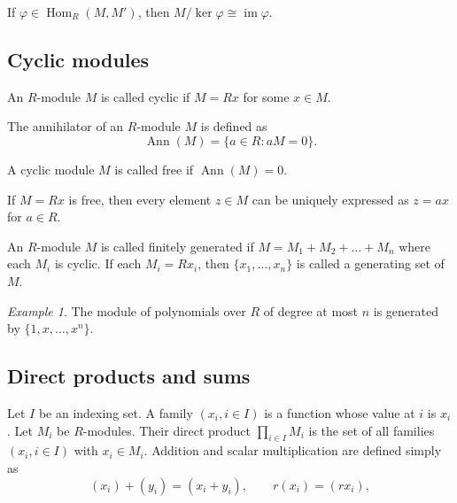 \documentclass[11pt]{article}
\DeclareMathOperator{\im}{im}
\DeclareMathOperator{\Hom}{Hom}
\DeclareMathOperator{\Ann}{Ann}
\theoremstyle{definition}
\theoremstyle{remark}
\newtheorem*{example}{Example}
\numberwithin{equation}{section}
\begin{document}
    \begin{theorem}
        If $\varphi \in \Hom_R(M, M')$, then $M/\ker\varphi \cong \im\varphi$.
    \end{theorem}


    \subsection{Cyclic modules}
    
    \begin{definition}
        An $R$-module $M$ is called cyclic if $M = Rx$ for some $x \in M$.
    \end{definition}

    \begin{definition}
        The annihilator of an $R$-module $M$ is defined as \[
            \Ann(M) = \{a \in R : aM = 0\}.
        \] 
    \end{definition}
    \begin{definition}
        A cyclic module $M$ is called free if $\Ann(M) = 0$.
    \end{definition}
    \begin{lemma}
        If $M = Rx$ is free, then every element $z \in M$ can be uniquely expressed
        as $z = ax$ for $a \in R$.
    \end{lemma}

    \begin{definition}
        An $R$-module $M$ is called finitely generated if $M = M_1 + M_2 + \dots +
        M_n$ where each $M_i$ is cyclic. If each $M_i = Rx_i$, then $\{x_1, \dots,
        x_n\}$ is called a generating set of $M$.
    \end{definition}
    \begin{example}
        The module of polynomials over $R$ of degree at most $n$ is generated by
        $\{1, x, \dots, x^n\}$.
    \end{example}


    \subsection{Direct products and sums}
    
    \begin{definition}
        Let $I$ be an indexing set. A family $(x_i, i \in I)$ is a function whose
        value at $i$ is $x_i$. Let $M_i$ be $R$-modules. Their direct product
        $\prod_{i \in I} M_i$ is the set of all families $(x_i, i \in I)$ with $x_i
        \in M_i$. Addition and scalar multiplication are defined simply as \[
            (x_i) + (y_i) = (x_i + y_i), \qquad r(x_i) = (rx_i),
        \] 
    \end{definition}
\end{document}
